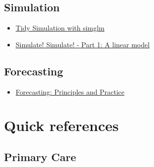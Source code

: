 \documentclass[]{book}
\providecommand{\tightlist}{%
  \setlength{\itemsep}{0pt}\setlength{\parskip}{0pt}}
\begin{document}
\hypertarget{simulation}{%
\section*{Simulation}\label{simulation}}

\begin{itemize}
\item
  \href{https://cran.r-project.org/web/packages/simglm/vignettes/tidy_simulation.html}{Tidy Simulation with simglm}
\item
  \href{https://aosmith.rbind.io/2018/01/09/simulate-simulate-part1/}{Simulate! Simulate! - Part 1: A linear model}
\end{itemize}

\hypertarget{forecasting}{%
\section*{Forecasting}\label{forecasting}}

\begin{itemize}
\tightlist
\item
  \href{https://otexts.com/fpp2/}{Forecasting: Principles and Practice}
\end{itemize}

\hypertarget{quick-references}{%
\chapter*{Quick references}\label{quick-references}}

\hypertarget{primary-care}{%
\section*{Primary Care}\label{primary-care}}
\end{document}
